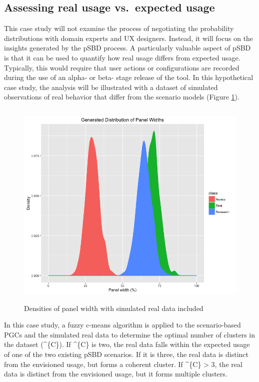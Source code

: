 \documentclass[]{article}
\begin{document}
\subsection{Assessing real usage vs.~expected
usage}\label{assessing-real-usage-vs.expected-usage}

This case study will not examine the process of negotiating the
probability distributions with domain experts and UX designers. Instead,
it will focus on the insights generated by the pSBD process. A
particularly valuable aspect of pSBD is that it can be used to quantify
how real usage differs from expected usage. Typically, this would
require that user actions or configurations are recorded during the use
of an alpha- or beta- stage release of the tool. In this hypothetical
case study, the analysis will be illustrated with a dataset of simulated
observations of real behavior that differ from the scenario models
(Figure \ref{densities_real}).

\begin{figure}[htbp]
\centering
\includegraphics[height=4.00000in]{./densities_w_real.png}
\caption{Densities of panel width with simulated real data included
\label{densities_real}}
\end{figure}

In this case study, a fuzzy c-means algorithm is applied to the
scenario-based PGCs and the simulated real data to determine the optimal
number of clusters in the dataset (\^{}\{C\}). If \^{}\{C\} is two, the
real data falls within the expected usage of one of the two existing
pSBD scenarios. If it is three, the real data is distinct from the
envisioned usage, but forms a coherent cluster. If \^{}\{C\}
\textgreater{} 3, the real data is distinct from the envisioned usage,
but it forms multiple clusters.
\end{document}
